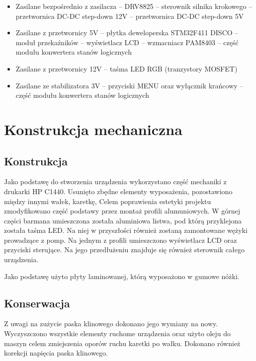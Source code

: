\documentclass[10pt, a4paper]{article}
\begin{document}
\begin{itemize}
    \item Zasilane bezpośrednio z zasilacza
    \subitem -- DRV8825 -- sterownik silnika krokowego
    \subitem -- przetwornica DC-DC step-down 12V
    \subitem -- przetwornica DC-DC step-down 5V
    
    \item Zasilane z przetwornicy 5V
    \subitem -- płytka deweloperska STM32F411 DISCO
    \subitem -- moduł przekaźników
    \subitem -- wyświetlacz LCD
    \subitem -- wzmacniacz PAM8403
    \subitem -- część modułu konwertera stanów logicznych
    
    \item Zasilane z przetwornicy 12V
    \subitem -- taśma LED RGB (tranzystory MOSFET)
    
    \item Zasilane ze stabilizatora 3V
    \subitem -- przyciski MENU oraz wyłącznik krańcowy
    \subitem -- część modułu konwertera stanów logicznych
\end{itemize}






\section{Konstrukcja mechaniczna}

\subsection{Konstrukcja}
Jako podstawę do stworzenia urządzenia wykorzystano część mechaniki z drukarki HP C1440. Usunięto zbędne elementy wyposażenia, pozostawiono między innymi wałek, karetkę, Celem poprawienia estetyki projektu zmodyfikowano część podstawy przez montaż profili alumuniowych. W górnej części barmana umieszczona została aluminiowa listwa, pod którą przyklejona została taśma LED. Na niej w przyszłości również zostaną zamontowane wężyki prowadzące z pomp. 
Na jednym z profili umieszczono wyświetlacz LCD oraz przyciski sterujące. Na jego przedłużeniu znajduje się również sterownik całego urządzenia.

Jako podstawę użyto płyty laminowanej, którą wyposażono w gumowe nóżki. 

\subsection{Konserwacja}
Z uwagi na zużycie paska klinowego dokonano jego wymiany na nowy. Wyczyszczono wszystkie elementy ruchome urządzenia oraz użyto oleju do maszyn celem zmiejszenia oporów ruchu karetki po wałku. Dokonano również korekcji napięcia paska klinowego. 
\end{document}
